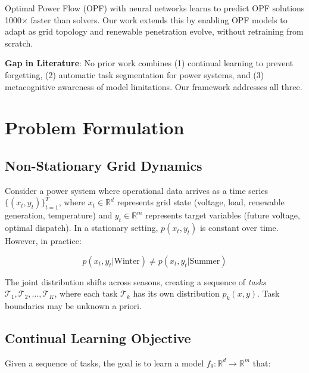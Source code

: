 \documentclass[journal]{IEEEtran}
\begin{document}
Optimal Power Flow (OPF) with neural networks \cite{pan2022deepopf} learns to predict OPF solutions 1000× faster than solvers. Our work extends this by enabling OPF models to adapt as grid topology and renewable penetration evolve, without retraining from scratch.

\textbf{Gap in Literature}: No prior work combines (1) continual learning to prevent forgetting, (2) automatic task segmentation for power systems, and (3) metacognitive awareness of model limitations. Our framework addresses all three.

\section{Problem Formulation}

\subsection{Non-Stationary Grid Dynamics}

Consider a power system where operational data arrives as a time series $\{(x_t, y_t)\}_{t=1}^T$, where $x_t \in \mathbb{R}^d$ represents grid state (voltage, load, renewable generation, temperature) and $y_t \in \mathbb{R}^m$ represents target variables (future voltage, optimal dispatch). In a stationary setting, $p(x_t, y_t)$ is constant over time. However, in practice:

\begin{equation}
p(x_t, y_t | \text{Winter}) \neq p(x_t, y_t | \text{Summer})
\end{equation}

The joint distribution shifts across seasons, creating a sequence of \textit{tasks} $\mathcal{T}_1, \mathcal{T}_2, \ldots, \mathcal{T}_K$, where each task $\mathcal{T}_k$ has its own distribution $p_k(x, y)$. Task boundaries may be unknown a priori.

\subsection{Continual Learning Objective}

Given a sequence of tasks, the goal is to learn a model $f_\theta : \mathbb{R}^d \to \mathbb{R}^m$ that:
\end{document}
